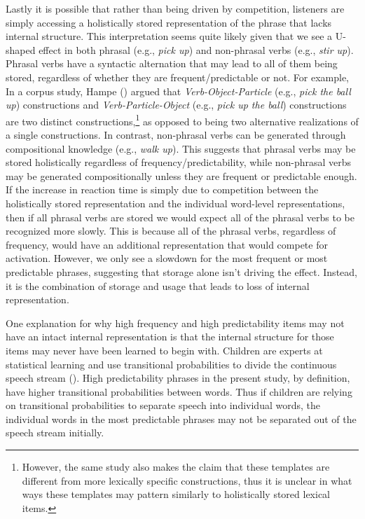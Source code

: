 \documentclass[
  12pt,
  letterpaper,
]{scrreprt}
\begin{document}
Lastly it is possible that rather than being driven by competition,
listeners are simply accessing a holistically stored representation of
the phrase that lacks internal structure. This interpretation seems
quite likely given that we see a U-shaped effect in both phrasal (e.g.,
\emph{pick up}) and non-phrasal verbs (e.g., \emph{stir up}). Phrasal
verbs have a syntactic alternation that may lead to all of them being
stored, regardless of whether they are frequent/predictable or not. For
example, In a corpus study, Hampe
() argued that
\emph{Verb-Object-Particle} (e.g., \emph{pick the ball up})
constructions and \emph{Verb-Particle-Object} (e.g., \emph{pick up the
ball}) constructions are two distinct constructions,\footnote{However,
  the same study also makes the claim that these templates are different
  from more lexically specific constructions, thus it is unclear in what
  ways these templates may pattern similarly to holistically stored
  lexical items.} as opposed to being two alternative realizations of a
single constructions. In contrast, non-phrasal verbs can be generated
through compositional knowledge (e.g., \emph{walk up}). This suggests
that phrasal verbs may be stored holistically regardless of
frequency/predictability, while non-phrasal verbs may be generated
compositionally unless they are frequent or predictable enough. If the
increase in reaction time is simply due to competition between the
holistically stored representation and the individual word-level
representations, then if all phrasal verbs are stored we would expect
all of the phrasal verbs to be recognized more slowly. This is because
all of the phrasal verbs, regardless of frequency, would have an
additional representation that would compete for activation. However, we
only see a slowdown for the most frequent or most predictable phrases,
suggesting that storage alone isn't driving the effect. Instead, it is
the combination of storage and usage that leads to loss of internal
representation.

One explanation for why high frequency and high predictability items may
not have an intact internal representation is that the internal
structure for those items may never have been learned to begin with.
Children are experts at statistical learning and use transitional
probabilities to divide the continuous speech stream
(). High predictability phrases in the present study, by definition,
have higher transitional probabilities between words. Thus if children
are relying on transitional probabilities to separate speech into
individual words, the individual words in the most predictable phrases
may not be separated out of the speech stream initially.
\end{document}
